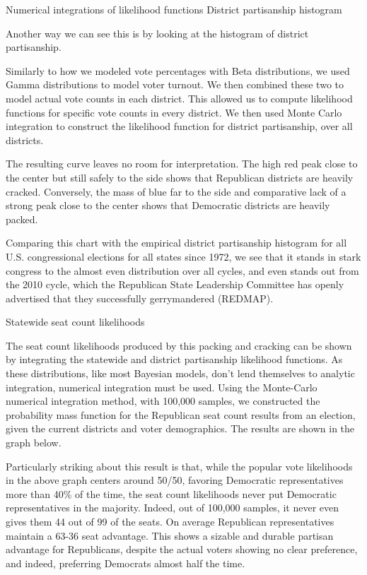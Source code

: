 \documentclass[preprint,12pt]{article}
\begin{document}
Numerical integrations of likelihood functions
District partisanship histogram
 
Another way we can see this is by looking at the histogram of district partisanship.
 
Similarly to how we modeled vote percentages with Beta distributions, we used Gamma distributions to model voter turnout.  We then combined these two to model actual vote counts in each district.  This allowed us to compute likelihood functions for specific vote counts in every district.  We then used Monte Carlo integration to construct the likelihood function for district partisanship, over all districts.
 
The resulting curve leaves no room for interpretation.  The high red peak close to the center but still safely to the side shows that Republican districts are heavily cracked.  Conversely, the mass of blue far to the side and comparative lack of a strong peak close to the center shows that Democratic districts are heavily packed.
 
 
 
 

 
 
 

Comparing this chart with the empirical district partisanship histogram for all U.S. congressional elections for all states since 1972, we see that it stands in stark congress to the almost even distribution over all cycles, and even stands out from the 2010 cycle, which the Republican State Leadership Committee has openly advertised that they successfully gerrymandered (REDMAP).

 
Statewide seat count likelihoods
 
The seat count likelihoods produced by this packing and cracking can be shown by integrating the statewide and district partisanship likelihood functions.  As these distributions, like most Bayesian models, don't lend themselves to analytic integration, numerical integration must be used. Using the Monte-Carlo numerical integration method, with 100,000 samples, we constructed the probability mass function for the Republican seat count results from an election, given the current districts and voter demographics.  The results are shown in the graph below.
 
Particularly striking about this result is that, while the popular vote likelihoods in the above graph centers around 50/50, favoring Democratic representatives more than 40\% of the time, the seat count likelihoods never put Democratic representatives in the majority.  Indeed, out of 100,000 samples, it never even gives them 44 out of 99 of the seats.  On average Republican representatives maintain a 63-36 seat advantage.   This shows a sizable and durable partisan advantage for Republicans, despite the actual voters showing no clear preference, and indeed, preferring Democrats almost half the time.
\end{document}
